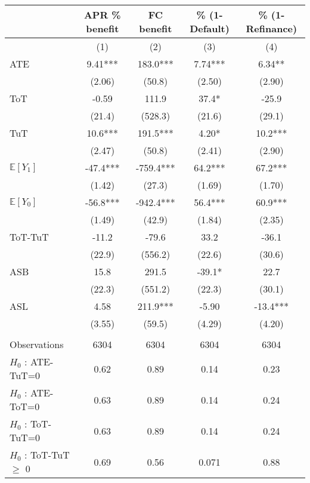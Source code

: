 \begin{tabular}{lcccc}
\toprule
      & APR \% benefit & FC benefit & \% (1-Default) & \% (1-Refinance) \\
\midrule
      & (1)   & (2)   & (3)   & (4) \\
\midrule
\midrule
ATE   & 9.41*** & 183.0*** & 7.74*** & 6.34** \\
      & (2.06) & (50.8) & (2.50) & (2.90) \\
ToT   & -0.59 & 111.9 & 37.4* & -25.9 \\
      & (21.4) & (528.3) & (21.6) & (29.1) \\
TuT   & 10.6*** & 191.5*** & 4.20* & 10.2*** \\
      & (2.47) & (50.8) & (2.41) & (2.90) \\
$\mathbb{E}[Y_1]$ & -47.4*** & -759.4*** & 64.2*** & 67.2*** \\
      & (1.42) & (27.3) & (1.69) & (1.70) \\
$\mathbb{E}[Y_0]$ & -56.8*** & -942.4*** & 56.4*** & 60.9*** \\
      & (1.49) & (42.9) & (1.84) & (2.35) \\
\midrule
ToT-TuT & -11.2 & -79.6 & 33.2  & -36.1 \\
      & (22.9) & (556.2) & (22.6) & (30.6) \\
ASB   & 15.8  & 291.5 & -39.1* & 22.7 \\
      & (22.3) & (551.2) & (22.3) & (30.1) \\
ASL   & 4.58  & 211.9*** & -5.90 & -13.4*** \\
      & (3.55) & (59.5) & (4.29) & (4.20) \\
      &       &       &       &  \\
\midrule
Observations & 6304  & 6304  & 6304  & 6304 \\
$H_0$ : ATE-TuT=0 & 0.62  & 0.89  & 0.14  & 0.23 \\
$H_0$ : ATE-ToT=0 & 0.63  & 0.89  & 0.14  & 0.24 \\
$H_0$ : ToT-TuT=0 & 0.63  & 0.89  & 0.14  & 0.24 \\
$H_0$ : ToT-TuT$\geq$ 0 & 0.69  & 0.56  & 0.071 & 0.88 \\
\bottomrule
\bottomrule
\end{tabular}%
